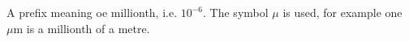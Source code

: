 A prefix meaning oe millionth, i.e. $10^{-6}.$  The symbol $ \mu $ is used,
for example one $ \mu \mathrm{m} $ is a millionth of a metre.